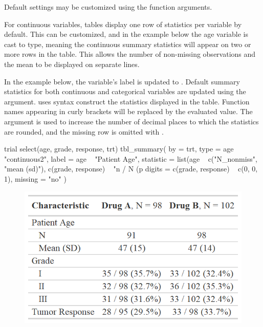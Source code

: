 Default settings may be customized using the  function arguments.



For continuous variables, tables display one row of statistics per variable by default.
This can be customized, and in the example below the age variable is cast to  type, meaning the continuous summary statistics will appear on two or more rows in the table. 
This allows the number of non-missing observations and the mean to be displayed on separate lines.

In the example below, the  variable's label is updated to .
Default summary statistics for both continuous and categorical variables are updated using the  argument. 
 uses  \citep{glue} syntax construct the statistics displayed in the table.
Function names appearing in curly brackets will be replaced by the evaluated value.
The  argument is used to increase the number of decimal places to which the statistics are rounded, and the missing row is omitted with .

\begin{example}
trial %
  select(age, grade, response, trt) %
  tbl_summary(
    by = trt,
    type = age ~ "continuous2",
    label = age ~ "Patient Age",
    statistic = list(age ~ c("{N_nonmiss}", "{mean} ({sd})"),
                     c(grade, response) ~ "{n} / {N} ({p}%
    digits = c(grade, response) ~ c(0, 0, 1),
    missing = "no"
  )
\end{example}
\begin{figure}[h!]
  \includegraphics[scale=0.49]{summary_plus.png}
  \centering
\end{figure}

